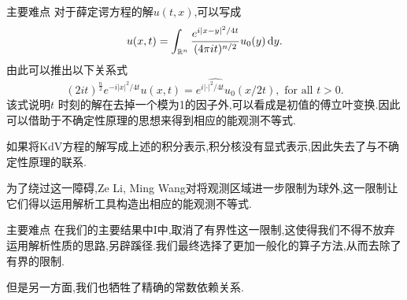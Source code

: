 \begin{frame}[t]{主要难点}
  对于薛定谔方程的解$u(t,x)$,可以写成
  \[
    u(x,t)=\int_{\mathbb{R}^{n}}\frac{e^{i|x-y|^2 /4t} }{(4\pi it)^{n /2}}u_0(y)\,\mathrm{d}y.
  \] 
  由此可以推出以下关系式
  \begin{equation}\label{rel}
    (2it)^{\frac{n}{2}}e^{-i|x|^2 /4t}u(x,t)=\widehat{e^{i|\cdot |^2 /4t}u_0}(x /2t), \text{ for all }t>0.
  \end{equation}
  该式说明$t$ 时刻的解在去掉一个模为1的因子外,可以看成是初值的傅立叶变换.因此可以借助于不确定性原理的思想来得到相应的能观测不等式.

如果将KdV方程的解写成上述的积分表示,积分核没有显式表示,因此失去了与不确定性原理的联系.

为了绕过这一障碍,Ze Li, Ming Wang对将观测区域进一步限制为球外,这一限制让它们得以运用解析工具构造出相应的能观测不等式.

\end{frame}
\begin{frame}[t]{主要难点}
  在我们的主要结果中I中,取消了有界性这一限制,这使得我们不得不放弃运用解析性质的思路,另辟蹊径.我们最终选择了更加一般化的算子方法,从而去除了有界的限制.

  但是另一方面,我们也牺牲了精确的常数依赖关系.
\end{frame}

